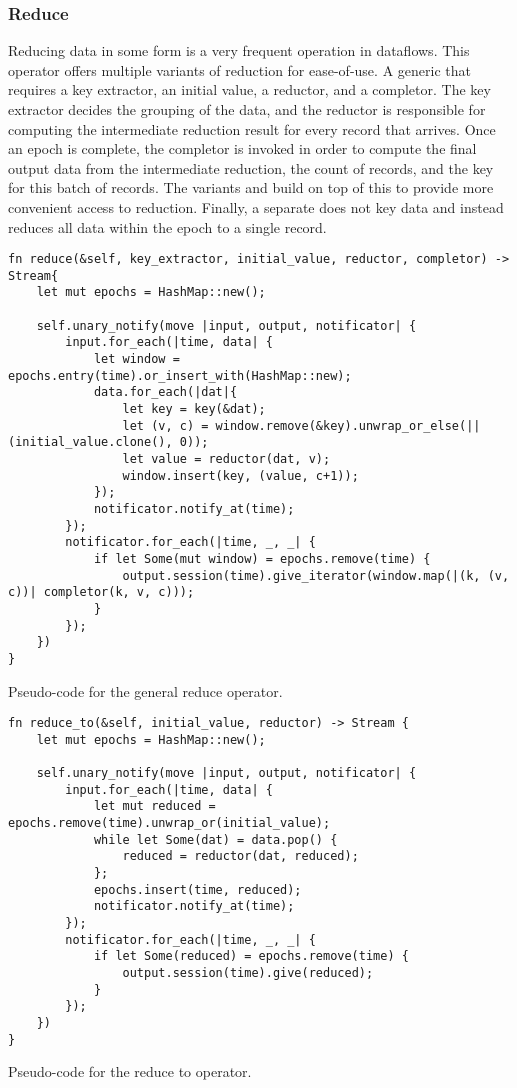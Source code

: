 \subsubsection{Reduce}
Reducing data in some form is a very frequent operation in dataflows. This operator offers multiple variants of reduction for ease-of-use. A generic  that requires a key extractor, an initial value, a reductor, and a completor. The key extractor decides the grouping of the data, and the reductor is responsible for computing the intermediate reduction result for every record that arrives. Once an epoch is complete, the completor is invoked in order to compute the final output data from the intermediate reduction, the count of records, and the key for this batch of records. The variants  and  build on top of this to provide more convenient access to reduction. Finally, a separate  does not key data and instead reduces all data within the epoch to a single record.

\begin{listing}[H]
\begin{verbatim}
fn reduce(&self, key_extractor, initial_value, reductor, completor) -> Stream{
    let mut epochs = HashMap::new();

    self.unary_notify(move |input, output, notificator| {
        input.for_each(|time, data| {
            let window = epochs.entry(time).or_insert_with(HashMap::new);
            data.for_each(|dat|{
                let key = key(&dat);
                let (v, c) = window.remove(&key).unwrap_or_else(|| (initial_value.clone(), 0));
                let value = reductor(dat, v);
                window.insert(key, (value, c+1));
            });
            notificator.notify_at(time);
        });
        notificator.for_each(|time, _, _| {
            if let Some(mut window) = epochs.remove(time) {
                output.session(time).give_iterator(window.map(|(k, (v, c))| completor(k, v, c)));
            }
        });
    })
}
\end{verbatim}
  \caption{Pseudo-code for the general reduce operator.}
  \label{lst:reduce}
\end{listing}

\begin{listing}[H]
\begin{verbatim}
fn reduce_to(&self, initial_value, reductor) -> Stream {
    let mut epochs = HashMap::new();
    
    self.unary_notify(move |input, output, notificator| {
        input.for_each(|time, data| {
            let mut reduced = epochs.remove(time).unwrap_or(initial_value);
            while let Some(dat) = data.pop() {
                reduced = reductor(dat, reduced);
            };
            epochs.insert(time, reduced);
            notificator.notify_at(time);
        });
        notificator.for_each(|time, _, _| {
            if let Some(reduced) = epochs.remove(time) {
                output.session(time).give(reduced);
            }
        });
    })
}
\end{verbatim}
  \caption{Pseudo-code for the reduce to operator.}
  \label{lst:reduce-to}
\end{listing}

